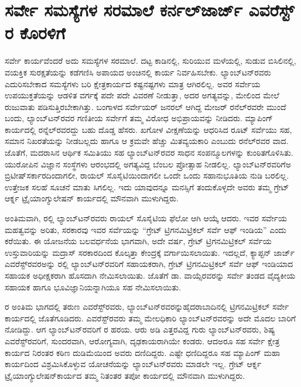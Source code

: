 
\chapter{ಸರ್ವೇ ಸಮಸ್ಯೆಗಳ ಸರಮಾಲೆ ಕರ್ನಲ್​ ಜಾರ್ಜ್ ಎವರೆಸ್ಟ್​ರ ಕೊರಳಿಗೆ}

\vskip -9pt

ಸರ್ವೇ ಕಾರ್ಯವೆಂದರೆ ಅದು ಸಮಸ್ಯೆಗಳ ಸರಮಾಲೆ. ದಟ್ಟ ಕಾಡಿನಲ್ಲಿ, ಸುರಿಯುವ ಮಳೆಯಲ್ಲಿ, ಸುಡುವ ಬಿಸಿಲಿನಲ್ಲಿ, ವಯಕ್ತಿಕ ಸುರಕ್ಷತೆಯನ್ನು ಕಡೆಗಣಿಸಿ ಅಪಾಯದ ಅಂಚಿನಲ್ಲಿ ಕಾರ್ಯ ನಿರ್ವಹಿಸಬೇಕು. ಲ್ಯಾಂಬ್​ಟನ್​ರವರು ಎದುರಿಸಬೇಕಾದ ಸಮಸ್ಯೆಗಳು ಬರಿ ಕ್ಷೇತ್ರಕಾರ್ಯದ ಕಷ್ಟನಷ್ಟಗಳು ಮಾತ್ರ ಆಗಿರಲಿಲ್ಲ. ಅವರ ಸರ್ವೇಯ ಉಪಯುಕ್ತತೆಯನ್ನು ಆಡಳಿತ ವರ್ಗಕ್ಕೆ ಪದೇ ಪದೇ ವಿವರಣೆ ನೀಡುತ್ತಾ, ಅದರ ಅಗತ್ಯವನ್ನು, ಮೇಲಿಂದ ಮೇಲೆ ರುಜುವಾತು ಪಡಿಸುತ್ತಿರಬೇಕಾಗಿತ್ತು. ಬಂಗಾಳದ ಸರ್ವೇಯರ್​ ಜನರಲ್​ ಆಗಿದ್ದ ಮೇಜರ್​ ರನೆಲ್​ರವರೇ ಮುಂದೆ ಬಂದು, ಲ್ಯಾಂಬ್​ಟನ್​ರವರ ಗಣಿತೀಯ ಸರ್ವೇಗೆ ತಮ್ಮ ವಿರೋಧ ಅಭಿಪ್ರಾಯವನ್ನು ನೀಡಿದರು. ಮ್ಯಾಪಿಂಗ್​ ಕಾರ್ಯದಲ್ಲಿ ರನ್ನೆಲ್​ರವರದ್ದು ಬಹು ದೊಡ್ಡ ಹೆಸರು. ಖಗೋಳ ವೀಕ್ಷಣೆಯನ್ನು ಆಧರಿಸಿದ ರೂಟ್​ ಸರ್ವೆಯು ಸಹ, ಸಮಾನ ನಿಖರತೆಯನ್ನು ನೀಡಬಲ್ಲದು ಹಾಗೂ ಆ ಕ್ರಮವೇ ಹೆಚ್ಚು ಮಿತವ್ಯಯಕಾರಿ ಎಂಬುದು ರನೆಲ್​ರವರ ವಾದ. ಜೊತೆಗೆ, ಮದರಾಸಿನ ಆರ್ಥಿಕ ಸಮಿತಿಯು ಸಹ ಲ್ಯಾಂಬ್​ಟನ್​ರವರ ಸಾಧನ ಸಂಪನ್ಮೂಲಗಳನ್ನು ಕುಂಠಿತಗೊಳಿಸಿತು. ಯುರೋಪಿನ ವಿಜ್ಞಾನ ಸಂಸ್ಥೆಗಳು ಆರಂಭದಲ್ಲಿ ಅಗತ್ಯವಿದ್ದ ಬೆಂಬಲ ಪ್ರೋತ್ಸಾಹ ನೀಡಲಿಲ್ಲ. ಲ್ಯಾಂಬ್​ಟನ್​ರವರಿಗೆಅ ಬ್ರಿಟೀಷ್​ ಸರ್ಕಾರದಿಂದಾಗಲೀ, ರಾಯಲ್​ ಸೊಸೈಟಿಯಿಂದಾಗಲೀ ಒಂದೇ ಒಂದು ಸಹಾನುಭೂತಿಯ ನುಡಿ ಬರಲಿಲ್ಲ. ಉತ್ತೇಜಕ ಸಲಹೆ ಸೂಚನೆ ಮಾತು ಸಿಗಲಿಲ್ಲ. ಇದು ಯಾವುದನ್ನೂ ಮನಸ್ಸಿಗೆ ತಂದುಕೊಳ್ಳದೇ ಅವರು ತಮ್ಮ ಗ್ರೇಟ್​ ಆರ್ಕ್ನ ಟ್ರೈಯಾಂಗ್ಯುಲೇಷನ್​ ಕಾರ್ಯದಲ್ಲಿ ಮೌನವಾಗಿ ಮುಳುಗಿದ್ದರು.

ಅಂತಿಮವಾಗಿ, ರಲ್ಲಿ ಲ್ಯಾಂಬ್​ಟನ್​ರವರು ರಾಯಲ್​ ಸೊಸೈಟಿಯ ಫೆಲೋ ಆಗಿ ಆಯ್ಕೆ ಆದರು. ಇವರ ಸರ್ವೇಯ ಮಹತ್ವವನ್ನು ಅರಿತು, ಸರಕಾರವು ಇವರ ಸರ್ವೆಯನ್ನು “ಗ್ರೇಟ್​ ಟ್ರಿಗನಮಿಟ್ರಿಕಲ್​ ಸರ್ವೆ ಆಫ್​ ಇಂಡಿಯ” ಎಂದು ಕರೆಯಿತು. ಈ ಯೋಜನೆಯ ಬಲವರ್ಧನೆಯ ಭಾಗವಾಗಿ, ಅದೇ ವರ್ಷ, ಗ್ರೇಟ್​ ಟ್ರಿಗನಮಿಟ್ರಿಕಲ್​ ಸರ್ವೆಯ ಉಸ್ತುವಾರಿಯನ್ನು ಮದ್ರಾಸ್​ ಸರಕಾರದಿಂದ ಕೊಲ್ಕತ್ತಾ ಕೇಂದ್ರಕ್ಕೆ ವರ್ಗಾಯಿಸಲಾಯಿತು. ಇದಲ್ಲದೆ, ಕ್ಯಾಪ್ಟನ್​ ಜಾರ್ಜ್ ಎವರೆಸ್ಟ್​ರವರಅನ್ನು  ರಲ್ಲಿ ಲ್ಯಾಂಬ್​ಟನ್​ರವರಿಗೆ ಸಹಾಯಕರಾಗಿ, ಗ್ರೇಟ್​ ಟ್ರಿಗನಮಿಟ್ರಿಕಲ್​ ಸರ್ವೆ ಆಫ್​ ಇಂಡಿಯಾದ ಸಹಾಯಕ ಅಧೀಕ್ಷಕರಾಗಿ ಹೊಸದಾಗಿ ನೇಮಿಸಲಾಯಿತು. ಜೊತೆಗೆ ಡಾ. ವಾಯ್ಸೆರವರನ್ನು ಸರ್ವೇ ತಂಡದ ವೈದ್ಯಕೀಯ ಸಹಾಯಕ ಹಾಗೂ ಭೂವಿಜ್ಞಾನಿಯನ್ನಾಗಿಯೂ ಸಹ ನೇಮಿಸಲಾಯಿತು.

ರ ಅಂತಿಮ ಭಾಗದಲ್ಲಿ ತರುಣ ಎವರೆಸ್ಟ್​ರವರು, ಲ್ಯಾಂಬ್​ಟನ್​ರವರನ್ನು\break ಹೈದರಾಬಾದಿನಲ್ಲಿ ಟ್ರಿಗನಮಿಟ್ರಿಕಲ್​ ಸರ್ವೇ ಕಾರ್ಯದಲ್ಲಿ ಜೊತೆಗೂಡಿದರು. ಎವರೆಸ್ಟ್​\break ರವರು ತಮ್ಮ ಮೇಲಧಿಕಾರಿ ಲ್ಯಾಂಬ್​ಟನ್​ರವರನ್ನು ಅದೇ ಮೊದಲ ಬಾರಿಗೆ ನೋಡಿದ್ದು. ಆಗ ಲ್ಯಾಂಬ್​ಟನ್​ರವರಿಗೆ ರ ಹರಯ. ಆರು ಅಡಿ ಎತ್ತರವಿದ್ದ ಗುರು ಲ್ಯಾಂಬ್​ಟನ್​\break ರವರು, ಶಿಷ್ಯ ಎವರೆಸ್ಟ್​ರವರಿಗೆ, ಸುಂದರವಾಗಿ, ಆರೋಗ್ಯವಾಗಿ, ದೃಢಕಾಯರಾಗಿಯೇ ಕಂಡರು. ಆದಅರೂ ಸಹ ಸರ್ವೇ ಕ್ಷೇತ್ರ ಕಾರ್ಯದ ನಿರಂತರ ಕಠಿಣ ದುಡಿಮೆಯಿಂದ ಅವರು ದಣಿದಿದ್ದರು. ಎಷ್ಟೇ ಧಣಿದಿದ್ದರೂ ಸಹ ಮ್ಯಾಪಿಂಗ್​ ಮಹಾ ಕಾರ್ಯದಿಂದ ವಿಶ್ರಮಿಸಿಕೊಳ್ಳುವ ಯೋಚನೆಯನ್ನು ಲ್ಯಾಂಬ್​ಟನ್​ರವರು ಮಾಡಲೇ ಇಲ್ಲ. ಗ್ರೇಟ್​ ಆರ್ಕ್ನ ಟ್ರೈಯಾಂಗ್ಯುಲೇಷನ್​ ಕಾರ್ಯದ ತಮ್ಮ ನಿತಂತರ ತಪೋ ಕಾರ್ಯದಲ್ಲಿ ಮೌನವಾಗಿ ಮುಳುಗಿದ್ದರು.


